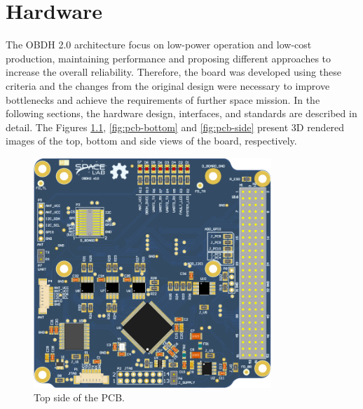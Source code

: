 %
%
%
%
%

%
%
%
%
%
%

\chapter{Hardware} \label{ch:hardware}

The OBDH 2.0 architecture focus on low-power operation and low-cost production, maintaining performance and proposing different approaches to increase the overall reliability. Therefore, the board was developed using these criteria and the changes from the original design were necessary to improve bottlenecks and achieve the requirements of further space mission. In the following sections, the hardware design, interfaces, and standards are described in detail. The Figures \ref{fig:pcb-top}, \ref{fig:pcb-bottom} and \ref{fig:pcb-side} present 3D rendered images of the top, bottom and side views of the board, respectively.

\begin{figure}[!ht]
    \begin{center}
        \includegraphics[width=0.8\textwidth]{figures/obdh2-pcb-top.png}
        \caption{Top side of the PCB.}
        \label{fig:pcb-top}
    \end{center}
\end{figure}

